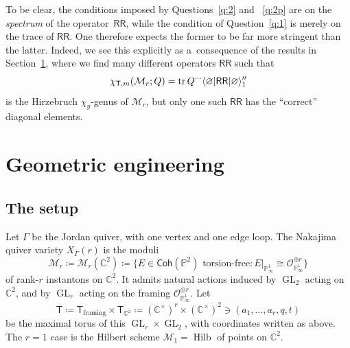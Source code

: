 \documentclass[pdftex]{sigma}%
\numberwithin{equation}{section}
\newcommand{\cat}[1]{\mathsf{#1}}
\newcommand{\bC}{\mathbb{C}}
\newcommand{\bP}{\mathbb{P}}
\newcommand{\cM}{\mathcal{M}}
\newcommand{\cO}{\mathcal{O}}
\newcommand{\kQ}{Q}
\newcommand{\sT}{\mathsf{T}}
\newcommand{\sRR}{\mathsf{RR}}
\DeclareMathOperator{\GL}{GL}
\DeclareMathOperator{\Hilb}{Hilb}
\DeclareMathOperator{\tr}{tr}
\DeclarePairedDelimiter{\inner}{\langle}{\rangle}
\begin{document}
\begin{MyParagraph}\label{sec:RR-spectrum-vs-trace}
To be clear, the conditions imposed by Questions~\ref{q:2} and
~\ref{q:2p} are on the {\it spectrum} of the operator~$\sRR$, while
the condition of Question~\ref{q:1} is merely on the trace of $\sRR$.
One therefore expects the former to be far more stringent than the
latter. Indeed, we see this explicitly as a~consequence of the results
in Section~\ref{sec:geometric-engineering}, where we find many different
operators $\sRR$ such that
\[ \chi_{\sT,m}(\cM_r; \kQ) = \tr \kQ^{\cdots} \inner{\varnothing | \sRR | \varnothing}_1'' \]
is the Hirzebruch $\chi_y$-genus of $\cM_r$, but only one such $\sRR$
has the ``correct'' diagonal elements.
\end{MyParagraph}

\section{Geometric engineering}
\label{sec:geometric-engineering}

\subsection{The setup}
\label{sec:geometric-engineering-setup}

\begin{MyParagraph}
Let $\Gamma$ be the Jordan quiver, with one vertex and
one edge loop. The Nakajima quiver variety $X_\Gamma(r)$ is the moduli
\[ \cM_r \coloneqq \cM_r(\bC^2) \coloneqq \big\{E \in \cat{Coh}(\bP^2) \text{ torsion-free}\colon E\big|_{\bP^1_\infty} \cong \cO_{\bP^1_\infty}^{\oplus r}\big\} \]
of rank-$r$ instantons on $\bC^2$. It admits natural actions induced
by $\GL_2$ acting on $\bC^2$, and by $\GL_r$ acting on the framing
$\cO_{\bP^1_\infty}^{\oplus r}$. Let
\[ \sT \coloneqq \sT_{\text{framing}} \times \sT_{\bC^2} \coloneqq (\bC^\times)^r \times (\bC^\times)^2 \ni (a_1, \ldots, a_r, q, t) \]
be the maximal torus of this $\GL_r \times \GL_2$, with coordinates
written as above. The $r = 1$ case is the Hilbert scheme $\cM_1 =
\Hilb$ of points on $\bC^2$.
\end{MyParagraph}
\end{document}
